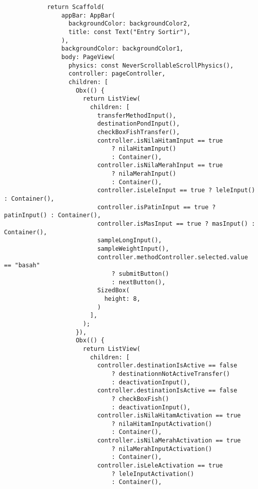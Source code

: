 \begin{lstlisting}
            return Scaffold(
                appBar: AppBar(
                  backgroundColor: backgroundColor2,
                  title: const Text("Entry Sortir"),
                ),
                backgroundColor: backgroundColor1,
                body: PageView(
                  physics: const NeverScrollableScrollPhysics(),
                  controller: pageController,
                  children: [
                    Obx(() {
                      return ListView(
                        children: [
                          transferMethodInput(),
                          destinationPondInput(),
                          checkBoxFishTransfer(),
                          controller.isNilaHitamInput == true
                              ? nilaHitamInput()
                              : Container(),
                          controller.isNilaMerahInput == true
                              ? nilaMerahInput()
                              : Container(),
                          controller.isLeleInput == true ? leleInput() : Container(),
                          controller.isPatinInput == true ? patinInput() : Container(),
                          controller.isMasInput == true ? masInput() : Container(),
                          sampleLongInput(),
                          sampleWeightInput(),
                          controller.methodController.selected.value == "basah"
                              ? submitButton()
                              : nextButton(),
                          SizedBox(
                            height: 8,
                          )
                        ],
                      );
                    }),
                    Obx(() {
                      return ListView(
                        children: [
                          controller.destinationIsActive == false
                              ? destinationnNotActiveTransfer()
                              : deactivationInput(),
                          controller.destinationIsActive == false
                              ? checkBoxFish()
                              : deactivationInput(),
                          controller.isNilaHitamActivation == true
                              ? nilaHitamInputActivation()
                              : Container(),
                          controller.isNilaMerahActivation == true
                              ? nilaMerahInputActivation()
                              : Container(),
                          controller.isLeleActivation == true
                              ? leleInputActivation()
                              : Container(),

\end{lstlisting}
